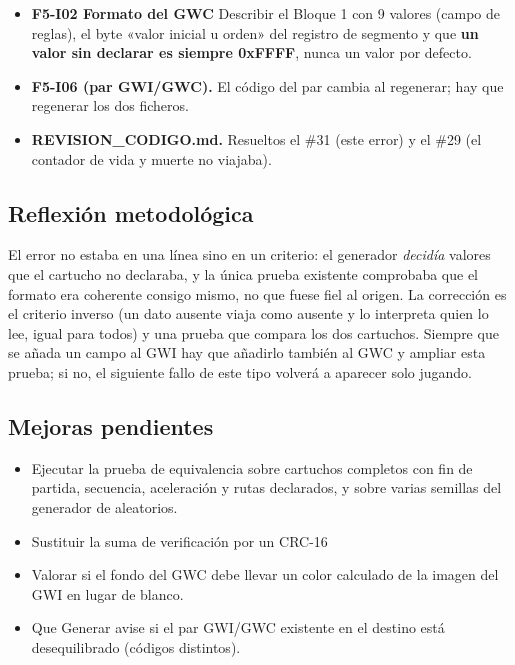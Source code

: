 \begin{itemize}
	\item \textbf{F5-I02 Formato del GWC} Describir el Bloque 1 con 9 valores (campo de reglas), el byte «valor inicial u orden» del registro de segmento y que \textbf{un valor sin declarar es siempre 0xFFFF}, nunca un valor por defecto.
	\item \textbf{F5-I06 (par GWI/GWC).} El código del par cambia al regenerar; hay que regenerar los dos ficheros.
	\item \textbf{REVISION\_CODIGO.md.} Resueltos el \#31 (este error) y el \#29 (el contador de vida y muerte no viajaba).
\end{itemize}

\subsection{Reflexión metodológica}
\label{sec:F5I13Reflexion}

El error no estaba en una línea sino en un criterio: el generador \emph{decidía} valores que el cartucho no declaraba, y la única prueba existente comprobaba que el formato era coherente consigo mismo, no que fuese fiel al origen. La corrección es el criterio inverso (un dato ausente viaja como ausente y lo interpreta quien lo lee, igual para todos) y una prueba que compara los dos cartuchos. Siempre que se añada un campo al GWI hay que añadirlo también al GWC y ampliar esta prueba; si no, el siguiente fallo de este tipo volverá a aparecer solo jugando.

\subsection{Mejoras pendientes}
\label{sec:F5I13Pendientes}

\begin{itemize}
	\item Ejecutar la prueba de equivalencia sobre cartuchos completos con fin de partida, secuencia, aceleración y rutas declarados, y sobre varias semillas del generador de aleatorios.
	\item Sustituir la suma de verificación por un CRC-16 
	\item Valorar si el fondo del GWC debe llevar un color calculado de la imagen del GWI en lugar de blanco.
	\item Que Generar avise si el par GWI/GWC existente en el destino está desequilibrado (códigos distintos).
\end{itemize}
